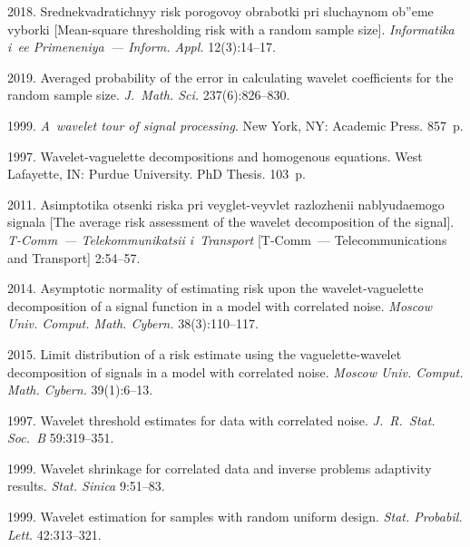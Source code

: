 \begin{multicols}{2}
{{\begin{thebibliography}{99}
 2018. Srednekvadratichnyy risk 
po\-ro\-go\-voy obrabotki pri sluchaynom ob''eme vyborki 
[Mean-square thresholding risk with a random sample size].
\textit{Informatika i~ee Primeneniya~--- Inform. Appl.} 12(3):14--17.

 2019. Averaged probability 
of the error in calculating wavelet coefficients for the random sample size. 
\textit{J.~Math. Sci.} 237(6):826--830.

 1999. \textit{A~wavelet tour of signal processing}. 
New York, NY: Academic Press. 857~p.

 1997. Wavelet-vaguelette decompositions and homogenous equations. 
West Lafayette, IN: Purdue University. PhD Thesis. 103~p.

 2011. Asimptotika otsenki riska pri veyglet-veyvlet 
 razlozhenii na\-blyu\-da\-emo\-go signala [The average risk assessment 
 of the wavelet decomposition of the signal]. \textit{T-Comm~--- 
 Telekommunikatsii i~Transport} [T-Comm~--- Telecommunications and Transport] 2:54--57.

 2014.
 Asymptotic normality of estimating risk upon the wavelet-vaguelette 
 decomposition of a signal function in a model with correlated noise. 
 \textit{Moscow Univ. Comput. Math. Cybern.} 38(3):110--117.

 2015. {Limit distribution of a risk estimate using the vaguelette-wavelet
  decomposition of signals in a model with correlated noise}. \textit{Moscow Univ. 
  Comput. Math.  Cybern.} 39(1):6--13.

 1997. Wavelet threshold estimates for data with correlated noise.
 \textit{J.~R.~Stat. Soc.~B} 59:319--351.

 1999. Wavelet shrinkage for correlated data and 
inverse problems adaptivity results. \textit{Stat. Sinica} 9:51--83.

 1999. 
Wavelet estimation for samples with random uniform design. 
\textit{Stat. Probabil. Lett.} 42:313--321.
\end{thebibliography}

 }
 }

\end{multicols}

